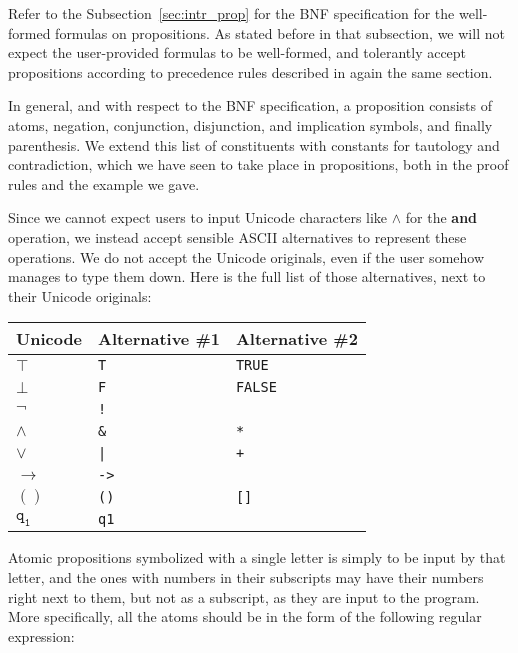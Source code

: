 \documentclass{article}
\newcommand{\imp}{\ensuremath{\rightarrow}}
\begin{document}
Refer to the Subsection~\ref{sec:intr_prop} for the BNF specification
for the well-formed formulas on propositions. As stated before
in that subsection, we will not expect the user-provided formulas
to be well-formed, and tolerantly accept propositions according
to precedence rules described in again the same section.

In general, and with respect to the BNF specification, a proposition
consists of atoms, negation, conjunction, disjunction, and implication
symbols, and finally parenthesis. We extend this list of constituents with
constants for tautology and contradiction, which we have seen to take
place in propositions, both in the proof rules and the example we gave.

Since we cannot expect users to input Unicode characters like $\land$
for the \textbf{and} operation, we instead accept sensible ASCII
alternatives to represent these operations. We do not accept the
Unicode originals, even if the user somehow manages to type them down.
Here is the full list of those alternatives, next to their Unicode
originals:

\begin{center}
	\begin{tabular}{l | l l}
		\textbf{Unicode} & \textbf{Alternative \#1} & \textbf{Alternative \#2}\\
		\hline
		$\mathtt{\top}$  & \verb|T|                & \verb|TRUE|\\
		$\mathtt{\bot}$  & \verb|F|                & \verb|FALSE|\\
		$\mathtt{\neg}$  & \verb|!|                & \\
		$\mathtt{\land}$ & \verb|&|                & \verb|*|\\
		$\mathtt{\lor}$  & \verb^|^                & \verb|+|\\
		$\mathtt{\imp}$  & \verb|->|               & \\
		$\mathtt{()}$    & \verb|()|               & \verb|[]|\\
		$\mathtt{q_1}$   & \verb|q1|               &
	\end{tabular}
\end{center}

Atomic propositions symbolized with a single letter is simply to be input
by that letter, and the ones with numbers in their subscripts may have
their numbers right next to them, but not as a subscript, as they are
input to the program. More specifically, all the atoms should be in the
form of the following regular expression:
\end{document}
